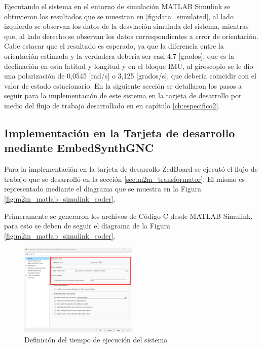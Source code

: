 Ejecutando el sistema en el entorno de simulación MATLAB Simulink se obtuvieron los resultados que se muestran en \ref{fig:data_simulated}, al lado izquierdo se observan los datos de la desviación simulada del sistema, mientras que, al lado derecho se observan los datos correspondientes a error de orientación. Cabe estacar que el resultado es esperado, ya que la diferencia entre la orientación estimada y la verdadera debería ser casi 4.7 [grados], que es la declinación en esta latitud y longitud y en el bloque IMU, al giroscopio se le dio una polarización de 0,0545 [rad/s] o 3,125 [grados/s], que debería coincidir con el valor de estado estacionario. En la siguiente sección se detallaron los pasos a seguir para la implementación de este sistema en la tarjeta de desarrollo por medio del flujo de trabajo desarrollado en en capítulo \ref{ch:especifico2}. 

\newpage

\subsection{Implementación en la Tarjeta de desarrollo mediante EmbedSynthGNC}


Para la implementación en la tarjeta de desarrollo ZedBoard se ejecutó el flujo de trabajo que se desarrolló en la sección \ref{sec:m2m_transformator}. El mismo es representado mediante el diagrama que se muestra en la Figura \ref{fig:m2m_matlab_simulink_coder}.

Primeramente se generaron los archivos de Código C desde MATLAB Simulink, para esto se deben de seguir el diagrama de la Figura \ref{fig:m2m_matlab_simulink_coder}. 

\begin{figure}[h!]
    \centering
    \includegraphics[width=0.5\textwidth]{fig/aditional/tiempo_ejecucion_imu.pdf}
    \caption{Definición del tiempo de ejecución del sistema}
    \label{fig:system_runtime_IMU}
\end{figure}

